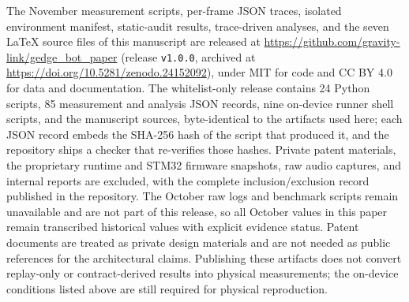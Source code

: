 \documentclass[conference]{IEEEtran}
\begin{document}
The November measurement scripts, per-frame JSON traces, isolated environment manifest, static-audit results, trace-driven analyses, and the seven \LaTeX{} source files of this manuscript are released at \url{https://github.com/gravity-link/gedge_bot_paper} (release \texttt{v1.0.0}, archived at \url{https://doi.org/10.5281/zenodo.24152092}), under MIT for code and CC BY 4.0 for data and documentation. The whitelist-only release contains 24 Python scripts, 85 measurement and analysis JSON records, nine on-device runner shell scripts, and the manuscript sources, byte-identical to the artifacts used here; each JSON record embeds the SHA-256 hash of the script that produced it, and the repository ships a checker that re-verifies those hashes. Private patent materials, the proprietary runtime and STM32 firmware snapshots, raw audio captures, and internal reports are excluded, with the complete inclusion/exclusion record published in the repository. The October raw logs and benchmark scripts remain unavailable and are not part of this release, so all October values in this paper remain transcribed historical values with explicit evidence status. Patent documents are treated as private design materials and are not needed as public references for the architectural claims. Publishing these artifacts does not convert replay-only or contract-derived results into physical measurements; the on-device conditions listed above are still required for physical reproduction.
\end{document}
